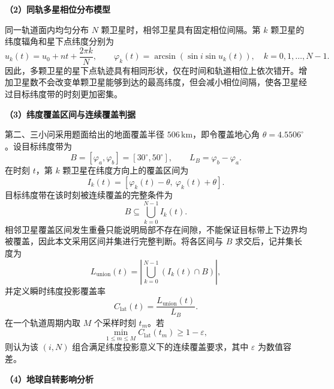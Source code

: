 \documentclass[withoutpreface,bwprint]{cumcmthesis} %
\begin{document}
\noindent\textbf{（2）同轨多星相位分布模型}

同一轨道面内均匀分布 $N$ 颗卫星时，相邻卫星具有固定相位间隔。第 $k$ 颗卫星的纬度辐角和星下点纬度分别为
\begin{equation}
    u_k(t)=u_0+nt+\frac{2\pi k}{N},\qquad
    \varphi_k(t)=\arcsin\!\left(\sin i\sin u_k(t)\right),
    \quad k=0,1,\ldots,N-1 .
    \label{eq:q1-argument-latitude}
\end{equation}
因此，多颗卫星的星下点轨迹具有相同形状，仅在时间和轨道相位上依次错开。增加卫星数不会改变单颗卫星能够到达的最高纬度，但会减小相位间隔，使各卫星经过目标纬度带的时刻更加密集。

\noindent\textbf{（3）纬度覆盖区间与连续覆盖判据}

第二、三小问采用题面给出的地面覆盖半径 $506\,\mathrm{km}$，即令覆盖地心角 $\theta=4.5506^\circ$。设目标纬度带为
\begin{equation}
    B=[\varphi_a,\varphi_b]=[30^\circ,50^\circ],\qquad
    L_B=\varphi_b-\varphi_a .
    \label{eq:q1-target-band}
\end{equation}
在时刻 $t$，第 $k$ 颗卫星在纬度方向上的覆盖区间为
\begin{equation}
    I_k(t)=\left[\varphi_k(t)-\theta,\ \varphi_k(t)+\theta\right].
    \label{eq:q1-interval}
\end{equation}
目标纬度带在该时刻被连续覆盖的完整条件为
\begin{equation}
    B\subseteq\bigcup_{k=0}^{N-1}I_k(t).
    \label{eq:q1-continuity-condition}
\end{equation}
相邻卫星覆盖区间发生重叠只能说明局部不存在间隙，不能保证目标带上下边界均被覆盖，因此本文采用区间并集进行完整判断。将各区间与 $B$ 求交后，记并集长度为
\begin{equation}
    L_{\mathrm{union}}(t)=
    \left|\bigcup_{k=0}^{N-1}\left(I_k(t)\cap B\right)\right|,
    \label{eq:q1-union-length}
\end{equation}
并定义瞬时纬度投影覆盖率
\begin{equation}
    C_{\mathrm{lat}}(t)=\frac{L_{\mathrm{union}}(t)}{L_B}.
    \label{eq:q1-coverage-rate}
\end{equation}
在一个轨道周期内取 $M$ 个采样时刻 $t_m$。若
\begin{equation}
    \min_{1\leq m\leq M}C_{\mathrm{lat}}(t_m)\geq1-\varepsilon,
    \label{eq:q1-full-coverage}
\end{equation}
则认为该 $(i,N)$ 组合满足纬度投影意义下的连续覆盖要求，其中 $\varepsilon$ 为数值容差。

\noindent\textbf{（4）地球自转影响分析}
\end{document}
